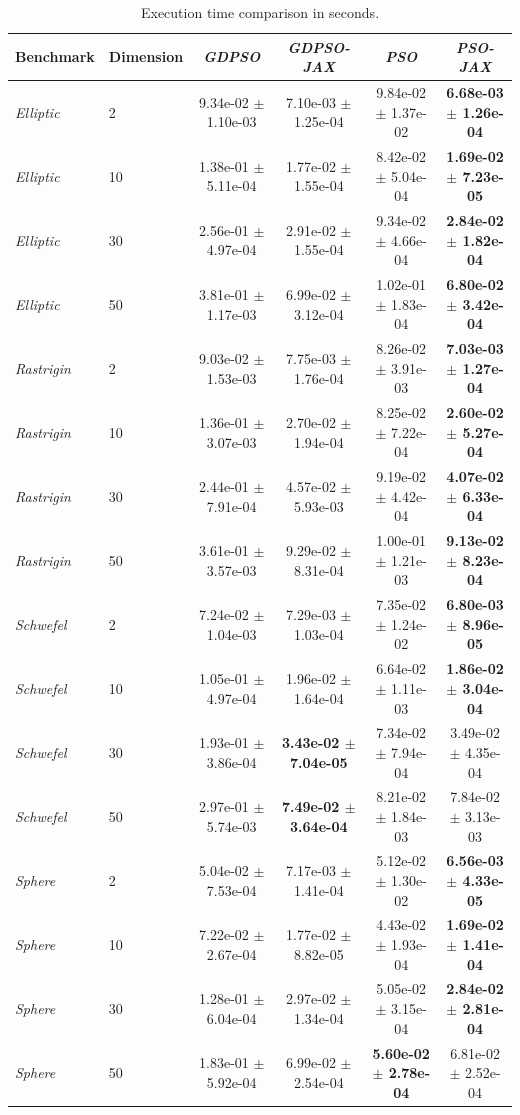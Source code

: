 \begin{table}[h]
\caption{Execution time comparison in seconds.}
\label{tab:execution_time}
\begin{tabular}{llcccc}
\toprule
Benchmark & Dimension & \textit{GDPSO} & \textit{GDPSO-JAX} & \textit{PSO} & \textit{PSO-JAX} \\
\midrule
\textit{Elliptic} & 2 & 9.34e-02 $\pm$ 1.10e-03 & 7.10e-03 $\pm$ 1.25e-04 & 9.84e-02 $\pm$ 1.37e-02 & \textbf{6.68e-03 $\pm$ 1.26e-04} \\
\textit{Elliptic} & 10 & 1.38e-01 $\pm$ 5.11e-04 & 1.77e-02 $\pm$ 1.55e-04 & 8.42e-02 $\pm$ 5.04e-04 & \textbf{1.69e-02 $\pm$ 7.23e-05} \\
\textit{Elliptic} & 30 & 2.56e-01 $\pm$ 4.97e-04 & 2.91e-02 $\pm$ 1.55e-04 & 9.34e-02 $\pm$ 4.66e-04 & \textbf{2.84e-02 $\pm$ 1.82e-04} \\
\textit{Elliptic} & 50 & 3.81e-01 $\pm$ 1.17e-03 & 6.99e-02 $\pm$ 3.12e-04 & 1.02e-01 $\pm$ 1.83e-04 & \textbf{6.80e-02 $\pm$ 3.42e-04} \\
\textit{Rastrigin} & 2 & 9.03e-02 $\pm$ 1.53e-03 & 7.75e-03 $\pm$ 1.76e-04 & 8.26e-02 $\pm$ 3.91e-03 & \textbf{7.03e-03 $\pm$ 1.27e-04} \\
\textit{Rastrigin} & 10 & 1.36e-01 $\pm$ 3.07e-03 & 2.70e-02 $\pm$ 1.94e-04 & 8.25e-02 $\pm$ 7.22e-04 & \textbf{2.60e-02 $\pm$ 5.27e-04} \\
\textit{Rastrigin} & 30 & 2.44e-01 $\pm$ 7.91e-04 & 4.57e-02 $\pm$ 5.93e-03 & 9.19e-02 $\pm$ 4.42e-04 & \textbf{4.07e-02 $\pm$ 6.33e-04} \\
\textit{Rastrigin} & 50 & 3.61e-01 $\pm$ 3.57e-03 & 9.29e-02 $\pm$ 8.31e-04 & 1.00e-01 $\pm$ 1.21e-03 & \textbf{9.13e-02 $\pm$ 8.23e-04} \\
\textit{Schwefel} & 2 & 7.24e-02 $\pm$ 1.04e-03 & 7.29e-03 $\pm$ 1.03e-04 & 7.35e-02 $\pm$ 1.24e-02 & \textbf{6.80e-03 $\pm$ 8.96e-05} \\
\textit{Schwefel} & 10 & 1.05e-01 $\pm$ 4.97e-04 & 1.96e-02 $\pm$ 1.64e-04 & 6.64e-02 $\pm$ 1.11e-03 & \textbf{1.86e-02 $\pm$ 3.04e-04} \\
\textit{Schwefel} & 30 & 1.93e-01 $\pm$ 3.86e-04 & \textbf{3.43e-02 $\pm$ 7.04e-05} & 7.34e-02 $\pm$ 7.94e-04 & 3.49e-02 $\pm$ 4.35e-04 \\
\textit{Schwefel} & 50 & 2.97e-01 $\pm$ 5.74e-03 & \textbf{7.49e-02 $\pm$ 3.64e-04} & 8.21e-02 $\pm$ 1.84e-03 & 7.84e-02 $\pm$ 3.13e-03 \\
\textit{Sphere} & 2 & 5.04e-02 $\pm$ 7.53e-04 & 7.17e-03 $\pm$ 1.41e-04 & 5.12e-02 $\pm$ 1.30e-02 & \textbf{6.56e-03 $\pm$ 4.33e-05} \\
\textit{Sphere} & 10 & 7.22e-02 $\pm$ 2.67e-04 & 1.77e-02 $\pm$ 8.82e-05 & 4.43e-02 $\pm$ 1.93e-04 & \textbf{1.69e-02 $\pm$ 1.41e-04} \\
\textit{Sphere} & 30 & 1.28e-01 $\pm$ 6.04e-04 & 2.97e-02 $\pm$ 1.34e-04 & 5.05e-02 $\pm$ 3.15e-04 & \textbf{2.84e-02 $\pm$ 2.81e-04} \\
\textit{Sphere} & 50 & 1.83e-01 $\pm$ 5.92e-04 & 6.99e-02 $\pm$ 2.54e-04 & \textbf{5.60e-02 $\pm$ 2.78e-04} & 6.81e-02 $\pm$ 2.52e-04 \\
\bottomrule
\end{tabular}
\end{table}

